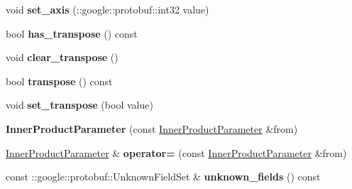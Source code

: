 \begin{DoxyCompactItemize}
\mbox{\label{classcaffe_1_1_inner_product_parameter_afbab482ca8a61e9683e4d3e877f9a739}} 
void {\bfseries set\+\_\+axis} (\+::google\+::protobuf\+::int32 value)
\item 
\mbox{\label{classcaffe_1_1_inner_product_parameter_a8be44c666de1aa32ab980a6c0e290fab}} 
bool {\bfseries has\+\_\+transpose} () const
\item 
\mbox{\label{classcaffe_1_1_inner_product_parameter_a3ae6ccd09df138f3c6e2785bb64f9585}} 
void {\bfseries clear\+\_\+transpose} ()
\item 
\mbox{\label{classcaffe_1_1_inner_product_parameter_a48939a318f5a272eb7c7e56553a39296}} 
bool {\bfseries transpose} () const
\item 
\mbox{\label{classcaffe_1_1_inner_product_parameter_ade6389304b6687afaef4fb03281aa587}} 
void {\bfseries set\+\_\+transpose} (bool value)
\item 
\mbox{\label{classcaffe_1_1_inner_product_parameter_a66337224dbcab154d6197f4fe96eb9d7}} 
{\bfseries Inner\+Product\+Parameter} (const \mbox{\hyperlink{classcaffe_1_1_inner_product_parameter}{Inner\+Product\+Parameter}} \&from)
\item 
\mbox{\label{classcaffe_1_1_inner_product_parameter_a09d35bbdaf492262bc11d6a538e9a5e2}} 
\mbox{\hyperlink{classcaffe_1_1_inner_product_parameter}{Inner\+Product\+Parameter}} \& {\bfseries operator=} (const \mbox{\hyperlink{classcaffe_1_1_inner_product_parameter}{Inner\+Product\+Parameter}} \&from)
\item 
\mbox{\label{classcaffe_1_1_inner_product_parameter_ace361952fab5c17ff421414879fadd5c}} 
const \+::google\+::protobuf\+::\+Unknown\+Field\+Set \& {\bfseries unknown\+\_\+fields} () const
\item 
\mbox{\label{classcaffe_1_1_inner_product_parameter_a6736c62857766f66be151eaf0bf4733a}} 

\end{DoxyCompactItemize}
